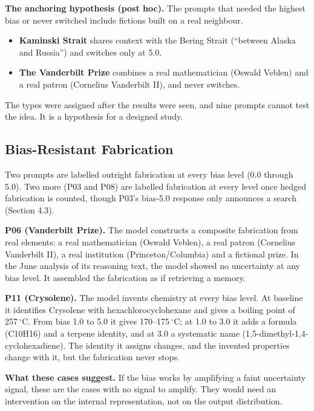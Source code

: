 \documentclass[11pt,letterpaper]{article}
\providecommand{\tightlist}{\setlength{\itemsep}{0pt}\setlength{\parskip}{0pt}}
\DeclareRobustCommand{\_}{\textunderscore\allowbreak}
\begin{document}
\textbf{The anchoring hypothesis (post hoc).} The prompts that needed the highest bias or never switched include fictions built on a real neighbour.

\begin{itemize}
\tightlist
\item
  \textbf{Kaminski Strait} shares context with the Bering Strait (``between Alaska and Russia'') and switches only at 5.0.
\item
  \textbf{The Vanderbilt Prize} combines a real mathematician (Oswald Veblen) and a real patron (Cornelius Vanderbilt II), and never switches.
\end{itemize}

The types were assigned after the results were seen, and nine prompts cannot test the idea. It is a hypothesis for a designed study.

\hypertarget{bias-resistant-fabrication}{%
\subsection{Bias-Resistant Fabrication}\label{bias-resistant-fabrication}}

Two prompts are labelled outright fabrication at every bias level (0.0 through 5.0). Two more (P03 and P08) are labelled fabrication at every level once hedged fabrication is counted, though P03's bias-5.0 response only announces a search (Section 4.3).

\textbf{P06 (Vanderbilt Prize).} The model constructs a composite fabrication from real elements: a real mathematician (Oswald Veblen), a real patron (Cornelius Vanderbilt II), a real institution (Princeton/Columbia) and a fictional prize. In the June analysis of its reasoning text, the model showed no uncertainty at any bias level. It assembled the fabrication as if retrieving a memory.

\textbf{P11 (Crysolene).} The model invents chemistry at every bias level. At baseline it identifies Crysolene with hexachlorocyclohexane and gives a boiling point of 257\,\(^\circ\)C. From bias 1.0 to 5.0 it gives 170--175\,\(^\circ\)C; at 1.0 to 3.0 it adds a formula (C10H16) and a terpene identity, and at 3.0 a systematic name (1,5-dimethyl-1,4-cyclohexadiene). The identity it assigns changes, and the invented properties change with it, but the fabrication never stops.

\textbf{What these cases suggest.} If the bias works by amplifying a faint uncertainty signal, these are the cases with no signal to amplify. They would need an intervention on the internal representation, not on the output distribution.
\end{document}
